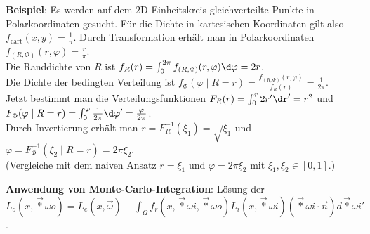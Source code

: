 \textbf{Beispiel}:
Es werden auf dem 2D-Einheitskreis gleichverteilte Punkte in Polarkoordinaten gesucht.
Für die Dichte in kartesischen Koordinaten gilt also $f_{\text{cart}}(x, y) = \frac{1}{\pi}$.
Durch Transformation erhält man in Polarkoordinaten $f_{(R,\Phi)}(r, \varphi) = \frac{r}{\pi}$.\\
Die Randdichte von $R$ ist
$f_R(r) = \int_0^{2\pi} f_{(R,\Phi)}(r, \varphi) \d\varphi = 2r$.\\
Die Dichte der bedingten Verteilung ist
$f_\Phi(\varphi\;|\;R = r) = \frac{f_{(R,\Phi)}(r, \varphi)}{f_R(r)} = \frac{1}{2\pi}$.\\
Jetzt bestimmt man die Verteilungsfunktionen
$F_R(r) = \int_0^r 2r' \dr' = r^2$ und\\
$F_\Phi(\varphi\;|\;R = r) = \int_0^\varphi \frac{1}{2\pi} \d\varphi' = \frac{\varphi}{2\pi}$.\\
Durch Invertierung erhält man $r = F_R^{-1}(\xi_1) = \sqrt{\xi_1}$ und
$\varphi = F_\Phi^{-1}(\xi_2\;|\;R = r) = 2\pi\xi_2$.\\
(Vergleiche mit dem naiven Ansatz $r = \xi_1$ und $\varphi = 2\pi\xi_2$ mit
$\xi_1, \xi_2 \in [0, 1]$.)

\linie

\textbf{Anwendung von Monte-Carlo-Integration}:
Lösung der \\
$L_o(x, \vec*{\omega}{o}) = L_e(x, \vec{\omega}) +
\int_\Omega f_r(x, \vec*{\omega}{i}, \vec*{\omega}{o}) L_i(x, \vec*{\omega}{i})
(\vec*{\omega}{i} \cdot \vec{n}) d\vec*{\omega}{i}'$.

\pagebreak
